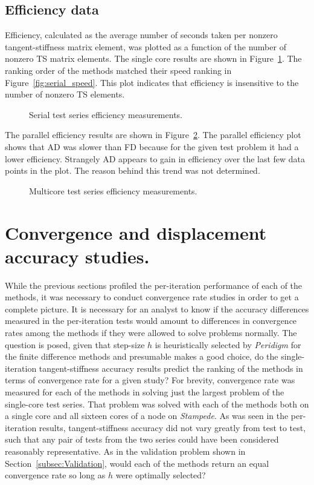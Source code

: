 \documentclass[preprint,12pt]{elsarticle}
\begin{document}
\subsection{Efficiency data}
%
Efficiency, calculated as the average number of seconds taken per nonzero tangent-stiffness matrix element, was plotted as a function of the number of nonzero TS matrix elements. The single core results are shown in Figure~\ref{fig:serial_efficiency}.  The ranking order of the methods matched their speed ranking in Figure~\ref{fig:serial_speed}. This plot indicates that efficiency is insensitive to the number of nonzero TS elements.  
%
\begin{figure}[tbp]
  \centering
  \scalebox{0.9}{}
  \caption{Serial test series efficiency measurements.}
  \label{fig:serial_efficiency}
\end{figure}
%
The parallel efficiency results are shown in Figure~\ref{fig:multi_efficiency}. The parallel efficiency plot shows that AD was slower than FD because for the given test problem it had a lower efficiency. Strangely AD appears to gain in efficiency over the last few data points in the plot. The reason behind this trend was not determined.
%
\begin{figure}[tbp]
  \centering
  \scalebox{0.9}{}
  \caption{Multicore test series efficiency measurements.}
  \label{fig:multi_efficiency}
\end{figure}



\section{Convergence and displacement accuracy studies.} 
\label{sec:PeridigmConvergenceStudy}
%
While the previous sections profiled the per-iteration performance of each of the methods, it was necessary to conduct convergence rate studies in order to get a complete picture. It is necessary for an analyst to know if the accuracy differences measured in the per-iteration tests would amount to differences in convergence rates among the methods if they were allowed to solve problems normally. The question is posed, given that step-size $h$ is heuristically selected by \emph{Peridigm} for the finite difference methods and presumable makes a good choice, do the single-iteration tangent-stiffness accuracy results predict the ranking of the methods in terms of convergence rate for a given study? For brevity, convergence rate was measured for each of the methods in solving just the largest problem of the single-core test series. That problem was solved with each of the methods both on a single core and all sixteen cores of a  node on \emph{Stampede}. As was seen in the per-iteration results, tangent-stiffness accuracy did not vary greatly from test to test, such that any pair of tests from the two series could have been considered reasonably representative. As in the validation problem shown in Section~\ref{subsec:Validation}, would each of the methods return an equal convergence rate so long as $h$ were optimally selected? 
\end{document}

